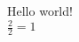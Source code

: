 \documentclass[12pt,a4paper]{article}
\begin{document}
Hello world!
\\
$\frac{2}{2} = 1$ %
\end{document}
